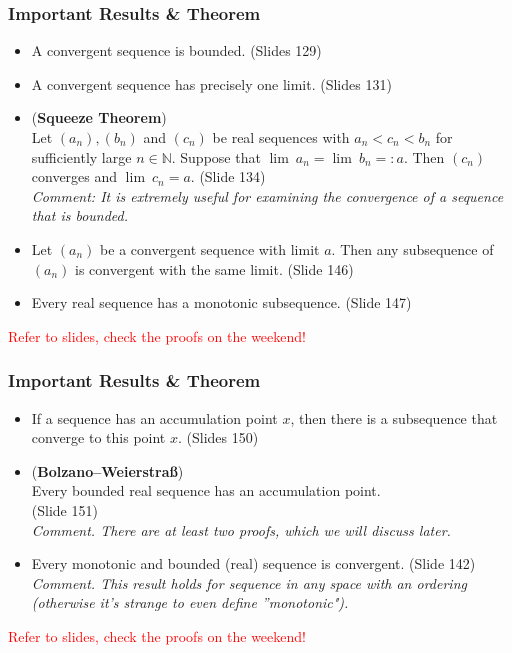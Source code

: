 \documentclass{beamer}
\newcommand{\myfont}{\rmfamily\normalsize\upshape\mdseries}
\begin{document}
\begin{frame}
    \frametitle{Important Results \& Theorem}
    \begin{itemize}
        \item A convergent sequence is bounded. (Slides 129)
        \item A convergent sequence has precisely one limit. (Slides 131)
        \item (\textbf{Squeeze Theorem}) \\Let $(a_n),(b_n)$ and $(c_n)$ be real sequences with $a_n<c_n<b_n$ 
            for sufficiently large $n\in\mathbb{N}$. Suppose that $\lim\ a_n=\lim\ b_n=:a$. Then 
            $(c_n)$ converges and $\lim\ c_n=a$. (Slide 134)\\
            \itshape{Comment:} It is extremely useful for examining the convergence of a sequence that is bounded.
        \myfont
        \item Let $(a_n)$ be a convergent sequence with limit $a$. Then any subsequence of $(a_n)$ 
            is convergent with the same limit. (Slide 146)
        \item Every real sequence has a monotonic subsequence. (Slide 147)
    \end{itemize}
    \vspace{1em}
    \textcolor{red}{Refer to slides, check the proofs on the weekend!}
\end{frame}
\begin{frame}
    \frametitle{Important Results \& Theorem}
    \begin{itemize}
        \item If a sequence has an accumulation point $x$, then there is a subsequence that converge to this point $x$. (Slides 150)
        \item (\textbf{Bolzano--Weierstraß})\\ Every bounded real sequence has an accumulation point. \\(Slide 151)\\
            \itshape{Comment.} There are at least two proofs, which we will discuss later.
        \item \myfont Every monotonic and bounded (real) sequence is convergent. (Slide 142)\\
            \itshape{Comment.} This result holds for sequence in any space with an ordering (otherwise it's 
            strange to even define ''monotonic").
    \end{itemize}
    \vspace{1em}
    \textcolor{red}{Refer to slides, check the proofs on the weekend!}
\end{frame}
\end{document}
